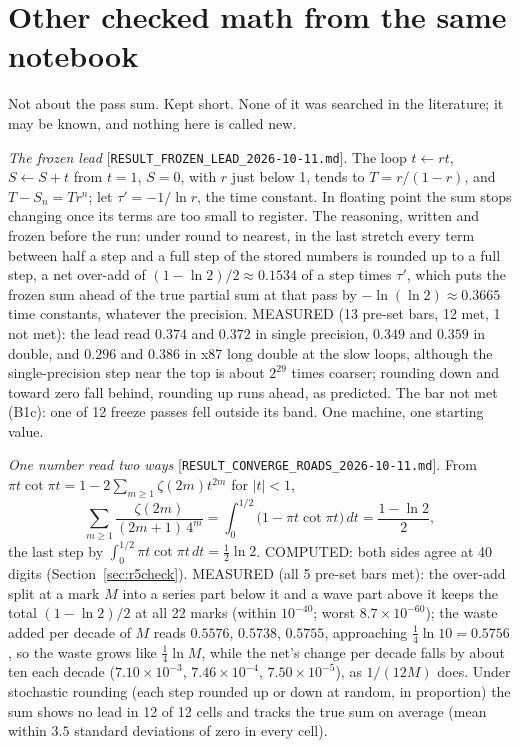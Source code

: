 \documentclass[11pt]{article}
\newcommand{\rec}[1]{\nolinkurl{#1}}
\begin{document}
\appendix
\section{Other checked math from the same notebook}\label{sec:appendix}
\sloppy

Not about the pass sum. Kept short. None of it was searched in the literature; it may be known, and nothing here is called new.

\medskip
\noindent\emph{The frozen lead} [\rec{RESULT_FROZEN_LEAD_2026-10-11.md}]. The loop $t\leftarrow rt$, $S\leftarrow S+t$ from $t=1$, $S=0$, with $r$ just below 1, tends to $T=r/(1-r)$, and $T-S_n=Tr^n$; let $\tau'=-1/\ln r$, the time constant. In floating point the sum stops changing once its terms are too small to register. The reasoning, written and frozen before the run: under round to nearest, in the last stretch every term between half a step and a full step of the stored numbers is rounded up to a full step, a net over-add of $(1-\ln2)/2\approx0.1534$ of a step times $\tau'$, which puts the frozen sum ahead of the true partial sum at that pass by $-\ln(\ln2)\approx0.3665$ time constants, whatever the precision. MEASURED (13 pre-set bars, 12 met, 1 not met): the lead read $0.374$ and $0.372$ in single precision, $0.349$ and $0.359$ in double, and $0.296$ and $0.386$ in x87 long double at the slow loops, although the single-precision step near the top is about $2^{29}$ times coarser; rounding down and toward zero fall behind, rounding up runs ahead, as predicted. The bar not met (B1c): one of 12 freeze passes fell outside its band. One machine, one starting value.

\medskip
\noindent\emph{One number read two ways} [\rec{RESULT_CONVERGE_ROADS_2026-10-11.md}]. From $\pi t\cot\pi t=1-2\sum_{m\ge1}\zeta(2m)t^{2m}$ for $|t|<1$,
\[
\sum_{m\ge1}\frac{\zeta(2m)}{(2m+1)\,4^m}=\int_0^{1/2}\bigl(1-\pi t\cot\pi t\bigr)\,dt=\frac{1-\ln2}{2},
\]
the last step by $\int_0^{1/2}\pi t\cot\pi t\,dt=\frac12\ln2$. COMPUTED: both sides agree at 40 digits (Section~\ref{sec:r5check}). MEASURED (all 5 pre-set bars met): the over-add split at a mark $M$ into a series part below it and a wave part above it keeps the total $(1-\ln2)/2$ at all 22 marks (within $10^{-40}$; worst $8.7\times10^{-60}$); the waste added per decade of $M$ reads $0.5576$, $0.5738$, $0.5755$, approaching $\frac14\ln10=0.5756$, so the waste grows like $\frac14\ln M$, while the net's change per decade falls by about ten each decade ($7.10\times10^{-3}$, $7.46\times10^{-4}$, $7.50\times10^{-5}$), as $1/(12M)$ does. Under stochastic rounding (each step rounded up or down at random, in proportion) the sum shows no lead in 12 of 12 cells and tracks the true sum on average (mean within $3.5$ standard deviations of zero in every cell).
\end{document}
